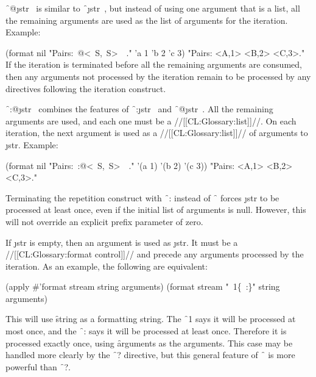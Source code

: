 \f{~@\lbr \j{str}~\rbr }
is similar to \f{~\lbr \j{str}~\rbr  }, but instead of
using one argument that is a list, all the remaining arguments
are used as the list of arguments for the iteration.
Example:
                                    
\code
 (format nil "Pairs:~@\lbr <~S,~S>~\rbr\ ." 'a 1 'b 2 'c 3)
\EV "Pairs: <A,1> <B,2> <C,3>."
\endcode
If the iteration is terminated before all the remaining arguments are
consumed, then any arguments not processed by the iteration remain to be
processed by any directives following the iteration construct.


\f{~:@\lbr \j{str}~\rbr  } 
combines the features                              
of \f{~:\lbr \j{str}~\rbr  }
and \f{~@\lbr \j{str}~\rbr  }.
All the remaining arguments
are used, and each one must be a //[[CL:Glossary:list]]//.
On each iteration, the next argument is 
used as a //[[CL:Glossary:list]]// of arguments to \j{str}.
Example:
                                     
\code
 (format nil "Pairs:~:@\lbr <~S,~S>~\rbr\ ." 
              '(a 1) '(b 2) '(c 3)) 
\EV "Pairs: <A,1> <B,2> <C,3>."
\endcode

Terminating the repetition construct with \f{~:\rbr } 
instead of \f{~\rbr  }
forces \j{str} to be processed at least once, even if the initial
list of arguments is null. However, this will not override an explicit
prefix parameter of zero.


If \j{str} is empty, then an argument is used as \j{str}.  
It must be a //[[CL:Glossary:format control]]//
and precede any arguments processed by the iteration.  As an example,
the following are equivalent:

\code
    (apply #'format stream string arguments)
 \EQ (format stream "~1\{~:\}" string arguments)
\endcode

This will use \f{string} as a formatting string.  
The \f{~1\lbr } says it will                 
be processed at most once, and the \f{~:\rbr } 
says it will be processed at least once.
Therefore it is processed exactly once, using \f{arguments} as the arguments.
This case may be handled more clearly by the \f{~?} directive,
but this general feature of \f{~\lbr  }
is more powerful than \f{~?}.

\endsubsubsection%



